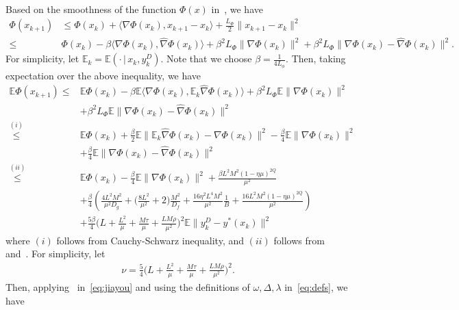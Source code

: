 \documentclass{osudissert96}
\begin{document}
Based on the smoothness of the function $\Phi(x)$ in~, we have 
\begin{align*}
\Phi(x_{k+1}) &\leq  \Phi(x_k)  + \langle \nabla \Phi(x_k), x_{k+1}-x_k\rangle + \frac{L_\Phi}{2} \|x_{k+1}-x_k\|^2 \nonumber
\\\leq& \Phi(x_k)  - \beta \langle \nabla \Phi(x_k),\widehat \nabla \Phi(x_k)\rangle + \beta^2 L_\Phi \|\nabla\Phi(x_k)\|^2+\beta^2 L_\Phi\|\nabla\Phi(x_k)-\widehat \nabla\Phi(x_k)\|^2.
\end{align*}
For simplicity, let $\mathbb{E}_k = \mathbb{E}(\cdot\,| \,x_k,y_k^D)$. Note that we choose $\beta=\frac{1}{4L_\phi}$. Then, 
taking expectation over the above inequality, we have
\begin{align} \label{eq:jiayou}
\mathbb{E}\Phi(x_{k+1}) \leq &\mathbb{E}\Phi(x_k)  - \beta \mathbb{E}\langle \nabla \Phi(x_k),\mathbb{E}_k\widehat \nabla \Phi(x_k)\rangle + \beta^2 L_\Phi \mathbb{E}\|\nabla\Phi(x_k)\|^2 \nonumber
\\&+\beta^2 L_\Phi\mathbb{E}\|\nabla\Phi(x_k)-\widehat \nabla\Phi(x_k)\|^2 \nonumber
\\\overset{(i)}\leq& \mathbb{E}\Phi(x_k)  +\frac{\beta}{2}\mathbb{E}\|\mathbb{E}_k\widehat \nabla \Phi(x_k)-\nabla \Phi(x_k) \|^2 -\frac{\beta}{4} \mathbb{E}\|\nabla\Phi(x_k)\|^2 \nonumber
\\&+\frac{\beta}{4}\mathbb{E}\|\nabla\Phi(x_k)-\widehat \nabla\Phi(x_k)\|^2 \nonumber
\\\overset{(ii)}\leq& \mathbb{E}\Phi(x_k) -\frac{\beta}{4}\mathbb{E}\|\nabla\Phi(x_k)\|^2 +\frac{\beta L^2M^2(1-\eta \mu)^{2Q}}{\mu^2} 
\nonumber
\\&+\frac{\beta}{4}
\left(   \frac{4L^2M^2}{\mu^2D_g} + \Big(\frac{8L^2}{\mu^2} + 2\Big) \frac{M^2}{D_f}+ \frac{16\eta^2  L^4M^2}{\mu^2} \frac{1}{B}+\frac{16 L^2M^2(1-\eta \mu)^{2Q}}{\mu^2}\right) \nonumber
\\&+  \frac{5\beta}{4} \Big( L+\frac{L^2}{\mu} + \frac{M\tau}{\mu}+\frac{LM\rho}{\mu^2}\Big)^2\mathbb{E}\|y_k^D-y^*(x_k)\|^2 
\end{align}
where $(i)$ follows from Cauchy-Schwarz inequality, and $(ii)$ follows from  and~. 
For simplicity,  let
\begin{align}\label{def:nu}
\nu= \frac{5}{4}\Big( L+\frac{L^2}{\mu} + \frac{M\tau}{\mu}+\frac{LM\rho}{\mu^2}\Big)^2.
\end{align} 
Then, applying~ in~\cref{eq:jiayou} and using the definitions of $\omega,\Delta,\lambda$ in~\cref{eq:defs}, we have 
\end{document}

